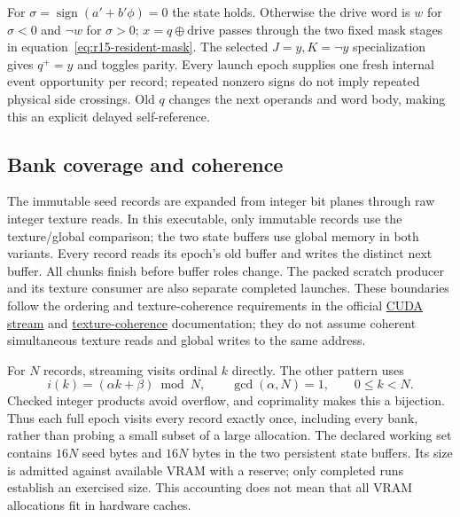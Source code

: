 For $\sigma=\operatorname{sign}(a'+b'\phi)=0$ the state holds. Otherwise
the drive word is $w$ for $\sigma<0$ and $\neg w$ for $\sigma>0$;
$x=q\mathbin{\oplus}\text{drive}$ passes through the two fixed mask stages
in equation~\eqref{eq:r15-resident-mask}. The selected $J=y,K=\neg y$
specialization gives $q^+=y$ and toggles parity. Every launch epoch supplies
one fresh internal event opportunity per record; repeated nonzero signs do
not imply repeated physical side crossings. Old $q$ changes the next
operands and word body, making this an explicit delayed self-reference.

\subsection{Bank coverage and coherence}
The immutable seed records are expanded from integer bit planes through raw
integer texture reads. In this executable, only immutable records use the
texture/global comparison; the two state buffers use global memory in both
variants. Every record reads its epoch's old buffer and writes the distinct
next buffer. All chunks finish before buffer roles change. The packed scratch
producer and its texture consumer are also separate completed launches.
These boundaries follow the ordering and texture-coherence requirements in
the official
\href{https://docs.nvidia.com/cuda/archive/12.8.1/cuda-c-programming-guide/index.html#streams}
{CUDA stream} and
\href{https://docs.nvidia.com/cuda/archive/12.8.1/cuda-c-programming-guide/index.html#read-write-coherency}
{texture-coherence} documentation; they do not assume coherent simultaneous
texture reads and global writes to the same address.

For $N$ records, streaming visits ordinal $k$ directly. The other pattern uses
\begin{equation}
 i(k)=(\alpha k+\beta)\bmod N,\qquad
 \gcd(\alpha,N)=1,\qquad 0\le k<N.
 \label{eq:r15-working-permutation}
\end{equation}
Checked integer products avoid overflow, and coprimality makes this a
bijection. Thus each full epoch visits every record exactly once, including
every bank, rather than probing a small subset of a large allocation.
The declared working set contains $16N$ seed bytes and $16N$ bytes in the two
persistent state buffers. Its size is admitted against available VRAM with
a reserve; only completed runs establish an exercised size. This accounting
does not mean that all VRAM allocations fit in hardware caches.


